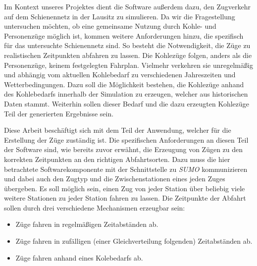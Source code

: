 Im Kontext unseres Projektes dient die Software außerdem dazu, den Zugverkehr auf dem Schienennetz in der Lausitz zu simulieren. Da wir die Fragestellung untersuchen möchten, ob eine gemeinsame Nutzung durch Kohle- und Personenzüge möglich ist, kommen weitere Anforderungen hinzu, die spezifisch für das untersuchte Schienennetz sind. So besteht die Notwendigkeit, die Züge zu realistischen Zeitpunkten abfahren zu lassen. Die Kohlezüge folgen, anders als die Personenzüge, keinem festgelegten Fahrplan. Vielmehr verkehren sie unregelmäßig und abhängig vom aktuellen Kohlebedarf zu verschiedenen Jahreszeiten und Wetterbedingungen. Dazu soll die Möglichkeit bestehen, die Kohlezüge anhand des Kohlebedarfs innerhalb der Simulation zu erzeugen, welcher aus historischen Daten stammt. Weiterhin sollen dieser Bedarf und die dazu erzeugten Kohlezüge Teil der generierten Ergebnisse sein.

Diese Arbeit beschäftigt sich mit dem Teil der Anwendung, welcher für die Erstellung der Züge zuständig ist. Die spezifischen Anforderungen an diesen Teil der Software sind, wie bereits zuvor erwähnt, die Erzeugung von Zügen zu den korrekten Zeitpunkten an den richtigen Abfahrtsorten. Dazu muss die hier betrachtete Softwarekomponente mit der Schnittstelle zu \emph{SUMO} kommunizieren und dabei auch den Zugtyp und die Zwischenstationen eines jeden Zuges übergeben. Es soll möglich sein, einen Zug von jeder Station über beliebig viele weitere Stationen zu jeder Station fahren zu lassen. Die Zeitpunkte der Abfahrt sollen durch drei verschiedene Mechanismen erzeugbar sein:
\begin{itemize}
    \item Züge fahren in regelmäßigen Zeitabständen ab.
    \item Züge fahren in zufälligen (einer Gleichverteilung folgenden) Zeitabständen ab.
    \item Züge fahren anhand eines Kolebedarfs ab.
\end{itemize}
